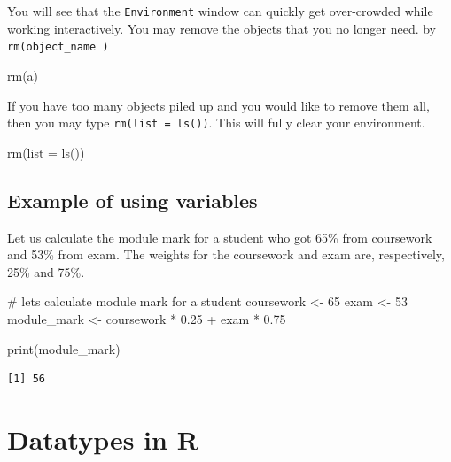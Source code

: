 \documentclass[
  letterpaper,
  DIV=11,
  numbers=noendperiod]{scrreprt}
\newenvironment{Shaded}{\begin{snugshade}}{\end{snugshade}}
\newcommand{\AttributeTok}[1]{\textcolor[rgb]{0.40,0.45,0.13}{#1}}
\newcommand{\CommentTok}[1]{\textcolor[rgb]{0.37,0.37,0.37}{#1}}
\newcommand{\DecValTok}[1]{\textcolor[rgb]{0.68,0.00,0.00}{#1}}
\newcommand{\FloatTok}[1]{\textcolor[rgb]{0.68,0.00,0.00}{#1}}
\newcommand{\FunctionTok}[1]{\textcolor[rgb]{0.28,0.35,0.67}{#1}}
\newcommand{\NormalTok}[1]{\textcolor[rgb]{0.00,0.23,0.31}{#1}}
\newcommand{\OtherTok}[1]{\textcolor[rgb]{0.00,0.23,0.31}{#1}}
\newcommand{\SpecialCharTok}[1]{\textcolor[rgb]{0.37,0.37,0.37}{#1}}
\begin{document}
You will see that the \texttt{Environment} window can quickly get
over-crowded while working interactively. You may remove the objects
that you no longer need. by \texttt{rm(object\_name\ )}

\begin{Shaded}
\begin{Highlighting}[]
\FunctionTok{rm}\NormalTok{(a)}
\end{Highlighting}
\end{Shaded}

If you have too many objects piled up and you would like to remove them
all, then you may type \texttt{rm(list\ =\ ls())}. This will fully clear
your environment.

\begin{Shaded}
\begin{Highlighting}[]
\FunctionTok{rm}\NormalTok{(}\AttributeTok{list =} \FunctionTok{ls}\NormalTok{())}
\end{Highlighting}
\end{Shaded}

\subsection{Example of using
variables}\label{example-of-using-variables}

Let us calculate the module mark for a student who got 65\% from
coursework and 53\% from exam. The weights for the coursework and exam
are, respectively, 25\% and 75\%.

\begin{Shaded}
\begin{Highlighting}[]
\CommentTok{\# let\textquotesingle{}s calculate module mark for a student}
\NormalTok{coursework }\OtherTok{\textless{}{-}} \DecValTok{65}
\NormalTok{exam }\OtherTok{\textless{}{-}} \DecValTok{53}
\NormalTok{module\_mark }\OtherTok{\textless{}{-}}\NormalTok{ coursework }\SpecialCharTok{*} \FloatTok{0.25} \SpecialCharTok{+}\NormalTok{ exam }\SpecialCharTok{*} \FloatTok{0.75}

\FunctionTok{print}\NormalTok{(module\_mark)}
\end{Highlighting}
\end{Shaded}

\begin{verbatim}
[1] 56
\end{verbatim}

\section{Datatypes in R}\label{datatypes-in-r}
\end{document}
